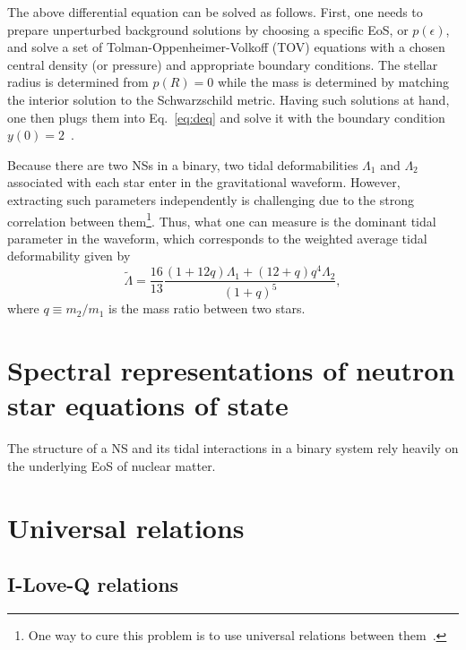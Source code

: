 \documentclass[prd,twocolumn,nofootinbib,superscriptaddress,amsmath,amssymb]{revtex4-1}
\begin{document}
The above differential equation can be solved as follows.
First, one needs to prepare unperturbed background solutions by choosing a specific EoS, or $p(\epsilon)$, and solve a set of Tolman-Oppenheimer-Volkoff (TOV) equations with a chosen central density (or pressure) and appropriate boundary conditions. The stellar radius is determined from $p(R)=0$ while the mass is determined by matching the interior solution to the Schwarzschild metric.
Having such solutions at hand, one then plugs them into Eq.~\eqref{eq:deq} and solve it with the boundary condition $y(0)=2$~\cite{hinderer-love}. 

Because there are two NSs in a binary, two tidal deformabilities $\Lambda_1$ and $\Lambda_2$ associated with each star enter in the gravitational waveform.
However, extracting such parameters independently is challenging due to the strong correlation between them\footnote{One way to cure this problem is to use universal relations between them~\cite{Yagi:2015pkc,Yagi:2016qmr}.}. 
Thus, what one can measure is the dominant tidal parameter in the waveform, which corresponds to the weighted average tidal deformability given by~\cite{Flanagan2008}
\begin{equation}
\tilde{\Lambda} = \frac{16}{13} \frac{(1+12q) \Lambda_1+(12+q)q^4\Lambda_2}{(1+q)^5},
\end{equation}
where $q \equiv m_2/m_1$ is the mass ratio between two stars.

\section{Spectral representations of neutron star equations of state}\label{sec:eos}
The structure of a NS and its tidal interactions in a binary system rely heavily on the underlying EoS of nuclear matter. 


\section{Universal relations}\label{sec:universal}

\subsection{I-Love-Q relations}\label{sec:ilq}
\end{document}
